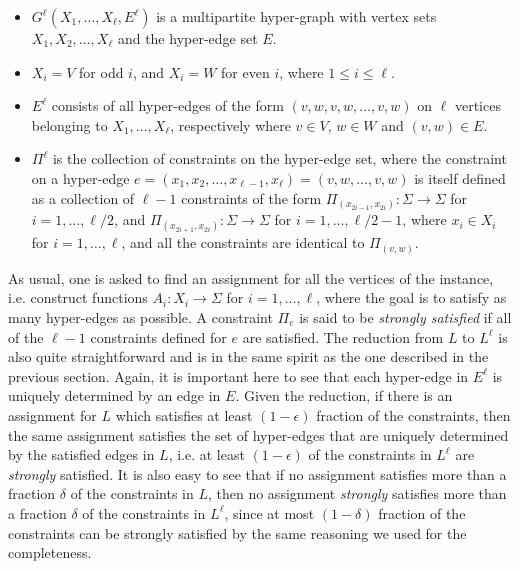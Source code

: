 \documentclass[11pt]{article}
\begin{document}
\begin{itemize}
\item $G^{\ell}(X_1, \hdots, X_{\ell},E^{\ell})$ is a multipartite
hyper-graph with vertex sets $X_1, X_2, \hdots, X_{\ell}$ and the
hyper-edge set $E$. \vspace{1mm}

\item $X_i = V$ for odd $i$, and $X_i = W$ for even $i$, where
$1 \leq i \leq \ell$. \vspace{1mm}

\item $E^{\ell}$ consists of all hyper-edges of the form
$(v,w,v,w,\hdots,v,w)$ on $\ell$ vertices belonging to $X_1, \hdots, X_{\ell}$,
respectively where $v \in V$, $w \in W$ and $(v,w) \in E$.

\item $\Pi^{\ell}$ is the collection of constraints on the
hyper-edge set, where the constraint on a hyper-edge
$e=(x_1,x_2,\hdots,x_{\ell-1},x_{\ell})=(v,w,\hdots,v,w)$ is itself
defined as a collection of $\ell-1$ constraints of the form
$\Pi_{(x_{2i-1},x_{2i})}\colon \Sigma \rightarrow \Sigma$ for $i=1,\hdots,\ell/2$, and
$\Pi_{(x_{2i+1},x_{2i})}\colon \Sigma \rightarrow \Sigma$ for $i=1,\hdots,\ell/2-1$, where
$x_i \in X_i$ for $i=1,\hdots,\ell$, and all the constraints are
identical to $\Pi_{(v,w)}$.
\end{itemize}

As usual, one is asked to find an assignment for all the
vertices of the instance, i.e. construct functions
$A_i\colon X_i \rightarrow \Sigma$ for $i=1, \hdots, \ell$,
where the goal is to satisfy as many hyper-edges as possible.
A constraint $\Pi_e$ is said to be \emph{strongly satisfied}
if all of the $\ell-1$ constraints defined for $e$ are satisfied.
The reduction from $L$ to $L^{\ell}$ is also
quite straightforward and is in the same spirit as the one
described in the previous section. Again, it is important here
to see that each hyper-edge in $E^{\ell}$ is uniquely
determined by an edge in $E$. Given the reduction, if there
is an assignment for $L$ which satisfies at least $(1-\epsilon)$
fraction of the constraints, then the same assignment
satisfies the set of hyper-edges that are uniquely determined
by the satisfied edges in $L$, i.e. at least $(1-\epsilon)$ of
the constraints in $L^{\ell}$ are \emph{strongly} satisfied. It
is also easy to see that if no assignment satisfies more than
a fraction $\delta$ of the constraints  in $L$, then no assignment
\emph{strongly} satisfies more than a fraction $\delta$
of the constraints in $L^{\ell}$, since at most
$(1-\delta)$ fraction of the constraints can be strongly
satisfied by the same reasoning we used for the completeness.
\end{document}
